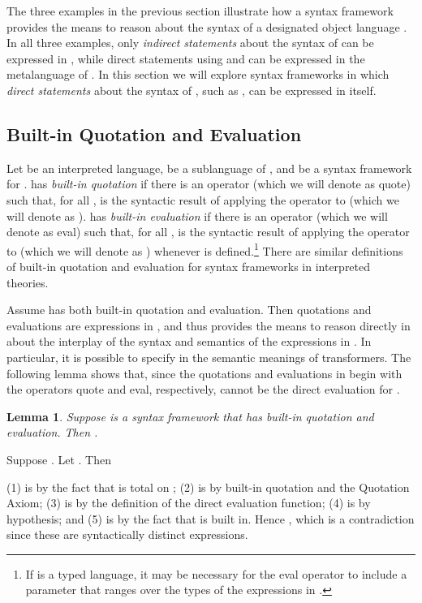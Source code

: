 \documentclass[11pt,fleqn]{article}
\newcommand{\bsp}{\begin{sloppypar}}
\newcommand{\esp}{\end{sloppypar}}
\newcommand{\dblsp}{\ \ }
\newcommand{\mname}[1]{\mbox{\sf #1}}
\newtheorem{lem}[thm]{Lemma}
\newenvironment{proof}{\par\noindent{\bf Proof\dblsp}}{\hfill}
\begin{document}
The three examples in the previous section illustrate how a syntax
framework provides the means to reason about the syntax of a
designated object language .  In all three
examples, only \emph{indirect statements} about the syntax of  can be expressed in , while direct statements using  and
 can be expressed in the metalanguage of .  In this section we
will explore syntax frameworks in which \emph{direct statements} about
the syntax of , such as , can be expressed
in  itself.

\subsection{Built-in Quotation and Evaluation}

\bsp Let  be an interpreted language,  be a
sublanguage of , and  be a syntax framework for .   has
\emph{built-in quotation} if there is an operator (which we will
denote as \mname{quote}) such that, for all ,
 is the syntactic result of applying the operator to  (which
we will denote as ).   has \emph{built-in
  evaluation} if there is an operator (which we will denote as
\mname{eval}) such that, for all ,  is the
syntactic result of applying the operator to  (which we will denote
as ) whenever  is defined.\footnote{If  is a typed language, it may be necessary for the
  \mname{eval} operator to include a parameter that ranges over the
  types of the expressions in .}  There are similar
definitions of built-in quotation and evaluation for syntax frameworks
in interpreted theories. \esp

Assume  has both built-in quotation and evaluation.  Then
quotations and evaluations are expressions in , and  thus
provides the means to reason directly in  about the interplay of
the syntax and semantics of the expressions in .  In
particular, it is possible to specify in  the semantic meanings of
transformers.  The following lemma shows that, since the quotations
and evaluations in  begin with the operators \mname{quote} and
\mname{eval}, respectively,  cannot be the direct evaluation for
.  

\begin{lem}
Suppose  is a syntax framework that has built-in quotation and
evaluation.  Then .
\end{lem}

\begin{proof}
Suppose .  Let .  Then
\setcounter{equation}{0}

(1) is by the fact that  is total on ; (2)
is by built-in quotation and the Quotation Axiom; (3) is by the
definition of the direct evaluation function; (4) is by hypothesis;
and (5) is by the fact that  is built in.  Hence , which is a contradiction since these
are syntactically distinct expressions.
\end{proof}
\end{document}
